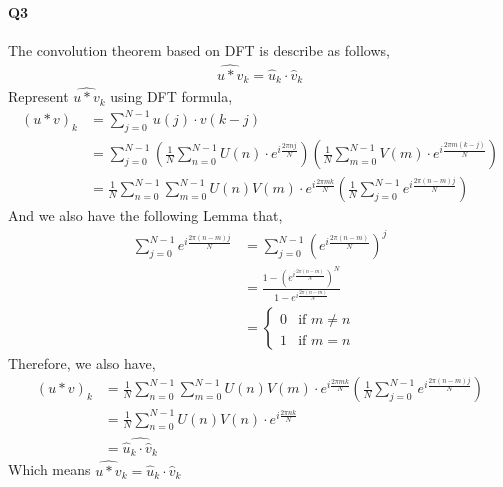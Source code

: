 \documentclass[11pt]{article}
\begin{document}
\paragraph{Q3}
The convolution theorem based on DFT is describe as follows,
\begin{align}
	\widehat{u*v}_k=\widehat{u}_k\cdot\widehat{v}_k
\end{align}
Represent $\widehat{u*v}_k$ using DFT formula,
\begin{align}
	(u*v)_k&=\sum_{j=0}^{N-1}u(j)\cdot v(k-j)\\
	&=\sum_{j=0}^{N-1}(\frac{1}{N}\sum_{n=0}^{N-1}U(n)\cdot e^{i\frac{2\pi nj}{N}})
	(\frac{1}{N}\sum_{m=0}^{N-1}V(m)\cdot e^{i\frac{2\pi m(k-j)}{N}})\\
	&=\frac{1}{N}\sum_{n=0}^{N-1}\sum_{m=0}^{N-1}U(n)V(m)\cdot e^{i\frac{2\pi mk}{N}}(\frac{1}{N}\sum_{j=0}^{N-1}e^{i\frac{2\pi (n-m)j}{N}})
\end{align}
And we also have the following Lemma that,
\begin{align}
	\sum_{j=0}^{N-1}e^{i\frac{2\pi (n-m)j}{N}}&=\sum_{j=0}^{N-1}(e^{i\frac{2\pi (n-m)}{N}})^j\\
	&=\frac{1-(e^{i\frac{2\pi (n-m)}{N}})^N}{1-e^{i\frac{2\pi (n-m)}{N}}}\\
	&=\begin{cases}
		0&\mbox{if $m\ne n$}\\
		1&\mbox{if $m=n$}
	\end{cases}
\end{align}
Therefore, we also have,
\begin{align}
	(u*v)_k&=\frac{1}{N}\sum_{n=0}^{N-1}\sum_{m=0}^{N-1}U(n)V(m)\cdot e^{i\frac{2\pi mk}{N}}(\frac{1}{N}\sum_{j=0}^{N-1}e^{i\frac{2\pi (n-m)j}{N}})\\
	&=\frac{1}{N}\sum_{n=0}^{N-1}U(n)V(n)\cdot e^{i\frac{2\pi nk}{N}}\\
	&=\widehat{\widehat{u}_k\cdot\widehat{v}_k}
\end{align}
Which means $\widehat{u*v}_k=\widehat{u}_k\cdot\widehat{v}_k$
\end{document}
